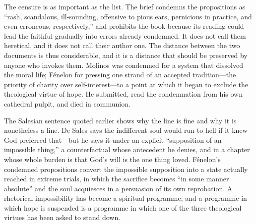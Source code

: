 The censure is as important as the list. The brief condemns the propositions as ``rash, scandalous, ill-sounding, offensive to pious ears, pernicious in practice, and even erroneous, respectively,'' and prohibits the book because its reading could lead the faithful gradually into errors already condemned. It does not call them heretical, and it does not call their author one. The distance between the two documents is thus considerable, and it is a distance that should be preserved by anyone who invokes them. Molinos was condemned for a system that dissolved the moral life; Fénelon for pressing one strand of an accepted tradition---the priority of charity over self-interest---to a point at which it began to exclude the theological virtue of hope. He submitted, read the condemnation from his own cathedral pulpit, and died in communion.

The Salesian sentence quoted earlier shows why the line is fine and why it is nonetheless a line. De Sales says the indifferent soul would run to hell if it knew God preferred that---but he says it under an explicit ``supposition of an impossible thing,'' a counterfactual whose antecedent he denies, and in a chapter whose whole burden is that God's will is the one thing loved. Fénelon's condemned propositions convert the impossible supposition into a state actually reached in extreme trials, in which the sacrifice becomes ``in some manner absolute'' and the soul acquiesces in a persuasion of its own reprobation. A rhetorical impossibility has become a spiritual programme; and a programme in which hope is suspended is a programme in which one of the three theological virtues has been asked to stand down.

